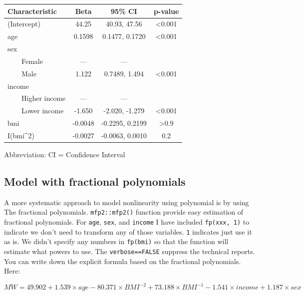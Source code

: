 \documentclass[
]{book}
\begin{document}
\begin{table}[t]
\fontsize{12.0pt}{14.0pt}\selectfont
\begin{tabular*}{\linewidth}{@{\extracolsep{\fill}}lccc}
\toprule
\textbf{Characteristic} & \textbf{Beta} & \textbf{95\% CI} & \textbf{p-value} \\ 
\midrule\addlinespace[2.5pt]
(Intercept) & 44.25 & 40.93, 47.56 & <0.001 \\ 
age & 0.1598 & 0.1477, 0.1720 & <0.001 \\ 
sex &  &  &  \\ 
    Female & — & — &  \\ 
    Male & 1.122 & 0.7489, 1.494 & <0.001 \\ 
income &  &  &  \\ 
    Higher income & — & — &  \\ 
    Lower income & -1.650 & -2.020, -1.279 & <0.001 \\ 
bmi & -0.0048 & -0.2295, 0.2199 & >0.9 \\ 
I(bmi\textasciicircum{}2) & -0.0027 & -0.0063, 0.0010 & 0.2 \\ 
\bottomrule
\end{tabular*}
\begin{minipage}{\linewidth}
\vspace{.05em}
Abbreviation: CI = Confidence Interval\\
\end{minipage}
\end{table}

\subsection{Model with fractional polynomials}\label{model-with-fractional-polynomials}

A more systematic approach to model nonlinearity using polynomial is by using The fractional polynomials. \texttt{mfp2::mfp2()} function provide easy estimation of fractional polynomials. For \texttt{age}, \texttt{sex}, and \texttt{income} I have included \texttt{fp(xxx,\ 1)} to indicate we don't need to transform any of those variables. \texttt{1} indicates just use it as is. We didn't specify any numbers in \texttt{fp(bmi)} so that the function will estimate what powers to use. The \texttt{verbose==FALSE} suppress the technical reports. You can write down the explicit formula based on the fractional polynomials. Here:

\[MW = 49.902 + 1.539 \times age - 80.371 \times BMI^{-2} + 73.188 \times BMI^{-1} - 1.541 \times income + 1.187 \times sex\]
\end{document}
